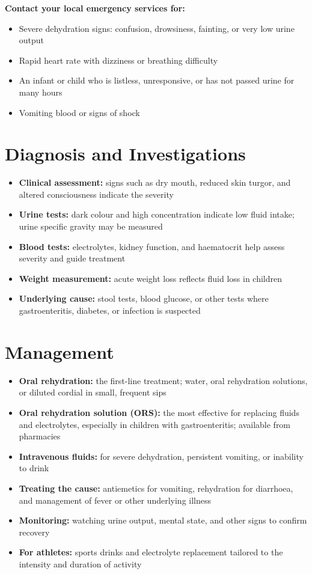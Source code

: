 \textbf{Contact your local emergency services for:}
\begin{itemize}
    \item Severe dehydration signs: confusion, drowsiness, fainting, or very low urine output
    \item Rapid heart rate with dizziness or breathing difficulty
    \item An infant or child who is listless, unresponsive, or has not passed urine for many hours
    \item Vomiting blood or signs of shock
\end{itemize}

\section*{Diagnosis and Investigations}
\begin{itemize}
    \item \textbf{Clinical assessment:} signs such as dry mouth, reduced skin turgor, and altered consciousness indicate the severity
    \item \textbf{Urine tests:} dark colour and high concentration indicate low fluid intake; urine specific gravity may be measured
    \item \textbf{Blood tests:} electrolytes, kidney function, and haematocrit help assess severity and guide treatment
    \item \textbf{Weight measurement:} acute weight loss reflects fluid loss in children
    \item \textbf{Underlying cause:} stool tests, blood glucose, or other tests where gastroenteritis, diabetes, or infection is suspected
\end{itemize}

\section*{Management}
\begin{itemize}
    \item \textbf{Oral rehydration:} the first-line treatment; water, oral rehydration solutions, or diluted cordial in small, frequent sips
    \item \textbf{Oral rehydration solution (ORS):} the most effective for replacing fluids and electrolytes, especially in children with gastroenteritis; available from pharmacies
    \item \textbf{Intravenous fluids:} for severe dehydration, persistent vomiting, or inability to drink
    \item \textbf{Treating the cause:} antiemetics for vomiting, rehydration for diarrhoea, and management of fever or other underlying illness
    \item \textbf{Monitoring:} watching urine output, mental state, and other signs to confirm recovery
    \item \textbf{For athletes:} sports drinks and electrolyte replacement tailored to the intensity and duration of activity
\end{itemize}

